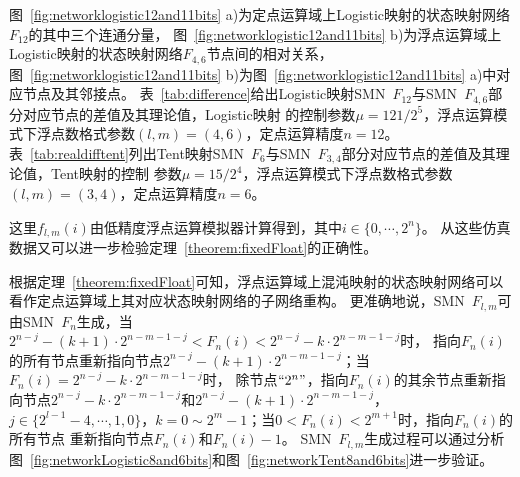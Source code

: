 \begin{table*}[!htb]
\centering
\caption{定点和浮点运算域上Tent映射的状态映射网络部分对应节点的差值}
\label{tab:realdifftent}
\end{table*}

图~\ref{fig:networklogistic12and11bits} a)为定点运算域上Logistic映射的状态映射网络$F_{12}$的其中三个连通分量，
图~\ref{fig:networklogistic12and11bits} b)为浮点运算域上Logistic映射的状态映射网络$F_{4, 6}$节点间的相对关系，
图~\ref{fig:networklogistic12and11bits} b)为图~\ref{fig:networklogistic12and11bits} a)中对应节点及其邻接点。
表~\ref{tab:difference}给出Logistic映射SMN\ $F_{12}$与SMN\ $F_{4, 6}$部分对应节点的差值及其理论值，Logistic映射
的控制参数$\mu=121/2^5$，浮点运算模式下浮点数格式参数$(l,m)=(4,6)$，定点运算精度$n=12$。
表~\ref{tab:realdifftent}列出Tent映射SMN\ $F_{6}$与SMN\ $F_{3, 4}$部分对应节点的差值及其理论值，Tent映射的控制
参数$\mu=15/2^4$，浮点运算模式下浮点数格式参数$(l,m)=(3,4)$，定点运算精度$n=6$。
\iffalse Tent映射的SMN\ $F_{3, 4}$和SMN\ $F_{6}$如图~\ref{fig:networkTent8and6bits}所示。\fi
这里$f_{l,m}(i)$由低精度浮点运算模拟器计算得到，其中$i\in \{0, \cdots, 2^n\}$。
从这些仿真数据又可以进一步检验定理~\ref{theorem:fixedFloat}的正确性。

根据定理~\ref{theorem:fixedFloat}可知，浮点运算域上混沌映射的状态映射网络可以看作定点运算域上其对应状态映射网络的子网络重构。
更准确地说，SMN\ $F_{l,m}$可由SMN\ $F_{n}$生成，当$2^{n-j}-(k+1)\cdot 2^{n-m-1-j} < F_{n}(i) < 2^{n-j}-k\cdot 2^{n-m-1-j}$时，
指向$F_{n}(i)$的所有节点重新指向节点$2^{n-j}-(k+1)\cdot 2^{n-m-1-j}$；当$F_{n}(i)= 2^{n-j}-k\cdot 2^{n-m-1-j}$时，
除节点$``2^{n}"$，指向$F_{n}(i)$的其余节点重新指向节点$2^{n-j}-k\cdot 2^{n-m-1-j}$和$2^{n-j}-(k+1)\cdot 2^{n-m-1-j}$，
$j\in \{2^{l-1}-4, \cdots, 1, 0\}$，$k=0\sim 2^{m}-1$；当$0 < F_{n}(i) < 2^{m+1}$时，指向$F_{n}(i)$的所有节点
重新指向节点$F_{n}(i)$和$F_{n}(i)-1$。
SMN\ $F_{l,m}$生成过程可以通过分析图~\ref{fig:networkLogistic8and6bits}和图~\ref{fig:networkTent8and6bits}进一步验证。

